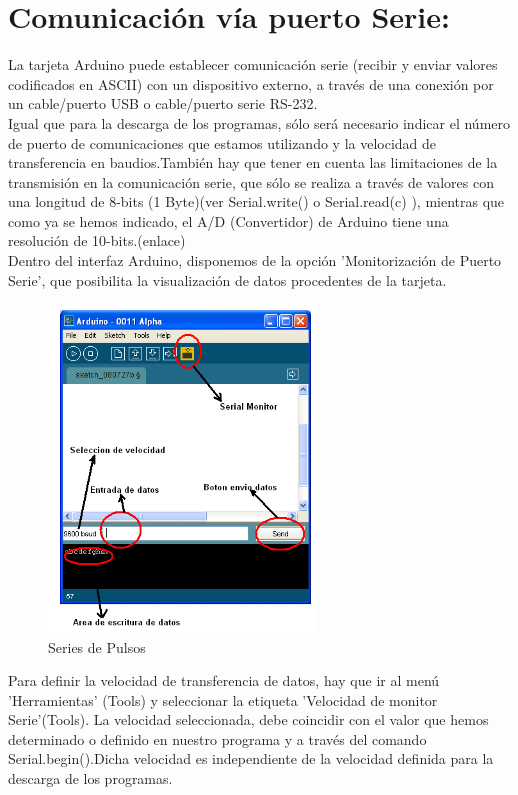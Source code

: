 \section{Comunicación vía puerto Serie:}

La tarjeta Arduino puede establecer comunicación serie (recibir y enviar valores codificados en ASCII) con un dispositivo externo, a través de una conexión por un cable/puerto USB o cable/puerto serie RS-232.\\
Igual que para la descarga de los programas, sólo será necesario indicar el número de puerto de comunicaciones que estamos utilizando y la velocidad de transferencia en baudios.También hay que tener en cuenta las limitaciones de la transmisión en la comunicación serie, que sólo se realiza a través de valores con una longitud de 8-bits (1 Byte)(ver Serial.write() o Serial.read(c) ), mientras que como ya se hemos indicado, el A/D (Convertidor) de Arduino tiene una resolución de 10-bits.(enlace)\\
Dentro del interfaz Arduino, disponemos de la opción 'Monitorización de Puerto Serie', que posibilita la visualización de datos procedentes de la tarjeta.
\begin{figure}[!htp]
	\centering
	\includegraphics[width=200pt]{./Imagenes/Documentos/ArduinoNotebook_img13.png}
	\caption[Series de pulsos]{Series de Pulsos}
\end{figure}
Para definir la velocidad de transferencia de datos, hay que ir al menú 'Herramientas' (Tools) y seleccionar la etiqueta 'Velocidad de monitor Serie'(Tools). La velocidad seleccionada, debe coincidir con el valor que hemos determinado o definido en nuestro programa y a través del comando Serial.begin().Dicha velocidad es independiente de la velocidad definida para la descarga de los programas.\\
